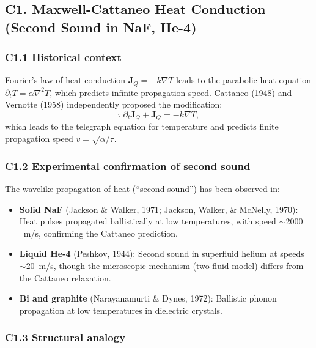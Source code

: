 \documentclass[reprint]{revtex4-2}
\begin{document}
\subsection{C1. Maxwell-Cattaneo Heat Conduction (Second Sound in NaF, He-4)}

\subsubsection{C1.1 Historical context}

Fourier's law of heat conduction $\mathbf{J}_Q = -k\nabla T$ leads to the parabolic heat equation $\partial_t T = \alpha\nabla^2 T$, which predicts infinite propagation speed. Cattaneo (1948) and Vernotte (1958) independently proposed the modification:
\begin{equation}
\tau\,\partial_t\mathbf{J}_Q + \mathbf{J}_Q = -k\nabla T,
\end{equation}
which leads to the telegraph equation for temperature and predicts finite propagation speed $v = \sqrt{\alpha/\tau}$.

\subsubsection{C1.2 Experimental confirmation of second sound}

The wavelike propagation of heat (``second sound'') has been observed in:
\begin{itemize}
\item \textbf{Solid NaF} (Jackson \& Walker, 1971; Jackson, Walker, \& McNelly, 1970): Heat pulses propagated ballistically at low temperatures, with speed $\sim 2000$~m/s, confirming the Cattaneo prediction.
\item \textbf{Liquid He-4} (Peshkov, 1944): Second sound in superfluid helium at speeds $\sim 20$~m/s, though the microscopic mechanism (two-fluid model) differs from the Cattaneo relaxation.
\item \textbf{Bi and graphite} (Narayanamurti \& Dynes, 1972): Ballistic phonon propagation at low temperatures in dielectric crystals.
\end{itemize}

\subsubsection{C1.3 Structural analogy}
\end{document}
